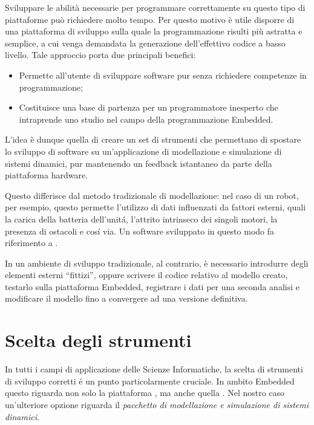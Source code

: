 Sviluppare le abilit\`a necessarie per programmare correttamente su questo
tipo di piattaforme pu\`o richiedere molto tempo. Per questo motivo \`e
utile disporre di una piattaforma di sviluppo sulla quale la
programmazione risulti pi\`u astratta e semplice, a cui venga demandata la
generazione dell'effettivo codice a basso livello. Tale approccio porta
due principali benefici:

\begin{itemize}

\item   Permette all'utente di sviluppare software pur senza richiedere
        competenze in programmazione;

\item   Costituisce una base di partenza per un programmatore inesperto
        che intraprende uno studio nel campo della programmazione
        Embedded.

\end{itemize}

L'idea \`e dunque quella di creare un set di strumenti che permettano di
spostare
lo sviluppo di software su un'applicazione di modellazione e simulazione
di sistemi dinamici, pur mantenendo un feedback istantaneo da parte della
piattaforma hardware.

Questo differisce dal metodo tradizionale di modellazione: nel caso di un
robot, per esempio, questo permette l'utilizzo di dati influenzati da
fattori esterni, quali la carica della batteria dell'unit\'a, l'attrito
intrinseco dei singoli motori, la presenza di ostacoli e cos\'i via.
Un software sviluppato in questo modo fa riferimento a .

In un ambiente di sviluppo tradizionale, al contrario, \`e necessario
introdurre degli elementi esterni ``fittizi'', oppure scrivere il codice
relativo al modello creato, testarlo sulla piattaforma Embedded,
registrare i dati per una seconda analisi e modificare il modello fino a
convergere ad una versione definitiva.

\section{Scelta degli strumenti}

In tutti i campi di applicazione delle Scienze Informatiche, la scelta di
strumenti di sviluppo corretti \'e un punto particolarmente cruciale.
In ambito Embedded questo riguarda non solo la piattaforma
, ma anche quella . Nel nostro
caso un'ulteriore opzione riguarda il \emph{pacchetto di modellazione e
simulazione di sistemi dinamici}.

